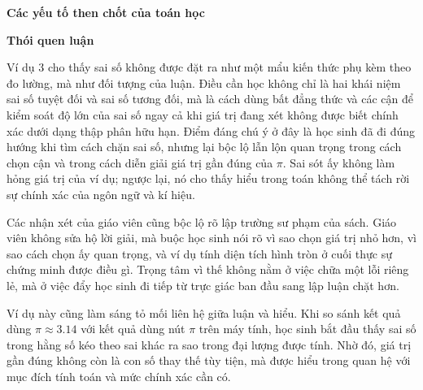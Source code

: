 {    \textbf{Các yếu tố then chốt của toán học}

    \begin{hanglist}
      \vspace{\baselineskip}
    \end{hanglist}

    \textbf{Thói quen luận}

    \begin{hanglist}


    \end{hanglist}
  }
  {
    \vspace{.5\baselineskip}
    Ví dụ 3 cho thấy sai số không được đặt ra như một mẩu kiến thức phụ kèm theo đo lường, mà như đối tượng của luận. Điều cần học không chỉ là hai khái niệm sai số tuyệt đối và sai số tương đối, mà là cách dùng bất đẳng thức và các cận để kiểm soát độ lớn của sai số ngay cả khi giá trị đang xét không được biết chính xác dưới dạng thập phân hữu hạn. Điểm đáng chú ý ở đây là học sinh đã đi đúng hướng khi tìm cách chặn sai số, nhưng lại bộc lộ lẫn lộn quan trọng trong cách chọn cận và trong cách diễn giải giá trị gần đúng của $\pi$. Sai sót ấy không làm hỏng giá trị của ví dụ; ngược lại, nó cho thấy hiểu trong toán không thể tách rời sự chính xác của ngôn ngữ và kí hiệu.

    Các nhận xét của giáo viên cũng bộc lộ rõ lập trường sư phạm của sách. Giáo viên không sửa hộ lời giải, mà buộc học sinh nói rõ vì sao chọn giá trị nhỏ hơn, vì sao cách chọn ấy quan trọng, và ví dụ tính diện tích hình tròn ở cuối thực sự chứng minh được điều gì. Trọng tâm vì thế không nằm ở việc chữa một lỗi riêng lẻ, mà ở việc đẩy học sinh đi tiếp từ trực giác ban đầu sang lập luận chặt hơn.

    Ví dụ này cũng làm sáng tỏ mối liên hệ giữa luận và hiểu. Khi so sánh kết quả dùng $\pi \approx 3.14$ với kết quả dùng nút $\pi$ trên máy tính, học sinh bắt đầu thấy sai số trong hằng số kéo theo sai khác ra sao trong đại lượng được tính. Nhờ đó, giá trị gần đúng không còn là con số thay thế tùy tiện, mà được hiểu trong quan hệ với mục đích tính toán và mức chính xác cần có.

    \begin{hanglist}
    \end{hanglist}
  }

